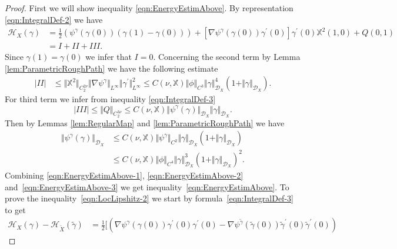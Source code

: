 \documentclass[11pt,a4paper,reqno]{amsart}%
\theoremstyle{plain}
\theoremstyle{remark}
\theoremstyle{plain}
\numberwithin{equation}{section}
\begin{document}
\begin{proof}%
First we will show inequality \eqref{eqn:EnergyEstimAbove}. By
representation \eqref{eqn:IntegralDef-2} we have
\begin{align}
\mathcal{H}_X(\gamma)&=\frac{1}{2}(\psi^{\gamma}(\gamma(0))(\gamma(1)-\gamma(0)))%
+\left[\nabla\psi^{\gamma}(\gamma(0))\gamma^\prime(0)\right]\gamma^\prime(0)\mathbb{X}^2(1,0)+Q(0,1)\nonumber\\
&=I+II+III . %
\end{align}
Since $\gamma(1)=\gamma(0)$ we infer that $I=0$.
Concerning the second term by Lemma \ref{lem:ParametricRoughPath}
we have the following estimate
\begin{align}
\vert II\vert &\leq
\Vert \mathbb{X}^2\Vert_{C_2^{2\nu}}\Vert \nabla\psi^\gamma\Vert_{L^{\infty}}\Vert \gamma^\prime\Vert_{L^{\infty}}^2
\leq
C(\nu,\mathbb{X})\Vert \phi\Vert_{C^3}\Vert \gamma\Vert_{\mathcal{D}_X}^4(1+\Vert \gamma\Vert_{\mathcal{D}_X}).\label{eqn:EnergyEstimAbove-1}
\end{align}
For third term we infer from inequality \eqref{eqn:IntegralDef-3}
\begin{equation}
\vert III\vert \leq \Vert Q\Vert_{C_2^{3\nu}}\leq
C(\nu,\mathbb{X})\Vert \psi^\gamma(\gamma)\Vert_{\mathcal{D}_X}\Vert \gamma\Vert_{\mathcal{D}_X}.\label{eqn:EnergyEstimAbove-2}
\end{equation}
Then by Lemmas \ref{lem:RegularMap} and
\ref{lem:ParametricRoughPath} we have
\begin{align}
\Vert \psi^{\gamma}(\gamma)\Vert_{\mathcal{D}_X}&\leq
C(\nu,\mathbb{X})\Vert \psi^{\gamma}\Vert_{C^2}\Vert \gamma\Vert_{\mathcal{D}_X}(1+\Vert \gamma\Vert_{\mathcal{D}_X})\nonumber\\
&\leq C(\nu,\mathbb{X})\Vert \phi\Vert_{C^4}\Vert \gamma\Vert_{\mathcal{D}_X}^3(1+\Vert \gamma\Vert_{\mathcal{D}_X})^2 . \label{eqn:EnergyEstimAbove-3}
\end{align}
Combining \eqref{eqn:EnergyEstimAbove-1},
\eqref{eqn:EnergyEstimAbove-2} and~\eqref{eqn:EnergyEstimAbove-3}
we get inequality~\eqref{eqn:EnergyEstimAbove}.
%
To prove the inequality~\eqref{eqn:LocLipshitz-2} we start by formula~\eqref{eqn:IntegralDef-3} to get
\begin{align}\label{eqn:EnergyLocLip-1}
\mathcal{H}_X(\gamma)-\mathcal{H}_{\tilde{X}}(\tilde{\gamma})&=\frac{1}{2}
\Big[(\nabla\psi^{\gamma}(\gamma(0))\gamma^\prime(0)\gamma^\prime(0)-\nabla\psi^{\tilde{\gamma}}(\tilde{\gamma}(0))\tilde{\gamma}^\prime(0)\tilde{\gamma}^\prime(0))

\end{align}
\end{proof}
\end{document}
